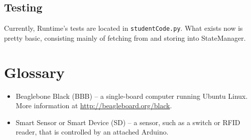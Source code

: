\documentclass[12pt]{book}
\begin{document}
\section{Testing}
Currently, Runtime's tests are located in \texttt{studentCode.py}. What
exists now is pretty basic, consisting mainly of fetching from and
storing into StateManager.

\chapter{Glossary}
\begin{itemize}
    \item Beaglebone Black (BBB) -- a single-board computer running Ubuntu Linux.
        More information at \url{http://beagleboard.org/black}.
    \item Smart Sensor or Smart Device (SD) -- a sensor, such as a switch
        or RFID reader, that is controlled by an attached Arduino.
\end{itemize}
\end{document}

